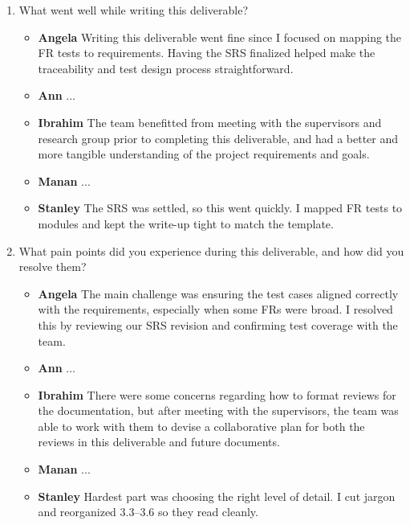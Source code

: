 \documentclass[12pt, titlepage]{article}
\begin{document}
\begin{enumerate}
  \item What went well while writing this deliverable? 
  \begin{itemize}
      \item \textbf{Angela} Writing this deliverable went fine since I focused on mapping the FR tests to requirements. Having the SRS finalized helped make the traceability and test design process straightforward.  
      \item \textbf{Ann} ...
      \item \textbf{Ibrahim} The team benefitted from meeting with the supervisors and research group prior to completing this deliverable, and had a better and more tangible understanding of the project requirements and goals.
      \item \textbf{Manan} ...
      \item \textbf{Stanley} The SRS was settled, so this went quickly. I mapped FR tests to modules and kept the write-up tight to match the template.
    \end{itemize}
  \item What pain points did you experience during this deliverable, and how
    did you resolve them?
  \begin{itemize}
      \item \textbf{Angela} The main challenge was ensuring the test cases aligned correctly with the requirements, especially when some FRs were broad. I resolved this by reviewing our SRS revision and confirming test coverage with the team.
      \item \textbf{Ann} ...
      \item \textbf{Ibrahim} There were some concerns regarding how to format reviews for the documentation, but after meeting with the supervisors, the team was able to work with them to devise a collaborative plan for both the reviews in this deliverable and future documents.
      \item \textbf{Manan} ...
      \item \textbf{Stanley} Hardest part was choosing the right level of detail. I cut jargon and reorganized 3.3–3.6 so they read cleanly.
    \end{itemize}


\end{enumerate}
\end{document}
